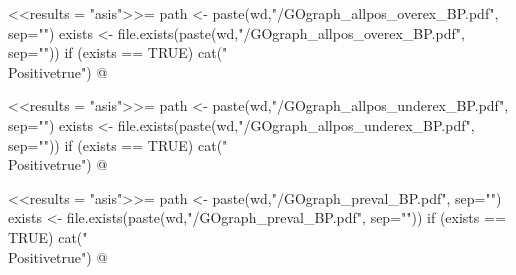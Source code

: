 \documentclass{article}
\begin{document}
\newif\ifPositive

<<results = "asis">>=
path <- paste(wd,"/GOgraph_allpos_overex_BP.pdf", sep="")
exists <- file.exists(paste(wd,"/GOgraph_allpos_overex_BP.pdf", sep=""))
if (exists == TRUE) {
  cat("\\Positivetrue")
}
@

\ifPositive
 \subsection{GOgraph showing overexpressed functions from all possible DEGs}
  This is the GO graph concerning the overexpressed DEGs from the all possible DEGs (Image extracted from {\bf"GOgraph\_allpos\_overex\_BP.pdf"} file):
  \begin{center}
    \texttt{[image: \\Sexpr\{path]}}
  \end{center}
\fi


\newif\ifPositive

<<results = "asis">>=
path <- paste(wd,"/GOgraph_allpos_underex_BP.pdf", sep="")
exists <- file.exists(paste(wd,"/GOgraph_allpos_underex_BP.pdf", sep=""))
if (exists == TRUE) {
  cat("\\Positivetrue")
}
@

\ifPositive
 \subsection{GOgraph showing underexpressed functions from all possible DEGs}
  This is the GO graph concerning the underexpressed DEGs from the all possible DEGs (Image extracted from {\bf"GOgraph\_allpos\_underex\_BP.pdf"} file):
  \begin{center}
    \texttt{[image: \\Sexpr\{path]}}
  \end{center}
\fi


\newif\ifPositive

<<results = "asis">>=
path <- paste(wd,"/GOgraph_preval_BP.pdf", sep="")
exists <- file.exists(paste(wd,"/GOgraph_preval_BP.pdf", sep=""))
if (exists == TRUE) {
  cat("\\Positivetrue")
}
@

\ifPositive
 \section{GO graphs of prevalent DEGs: Biological Process (BP))}
  \subsection{General GOgraph from prevalent DEGs}
  This is the GO graph concerning the prevalent DEGs (Image extracted from {\bf"GOgraph\_preval\_BP.pdf"} file):
  \begin{center}
    \texttt{[image: \\Sexpr\{path]}}
  \end{center}
\fi
\end{document}
